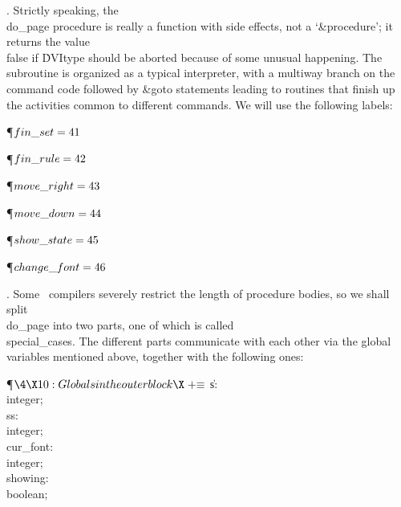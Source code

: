 . Strictly speaking, the \\{do\_page} procedure is really a function with
side effects, not a `\&{procedure}'\thinspace; it returns the value \\{false}
if \.{DVItype} should be aborted because of some unusual happening. The
subroutine is organized as a typical interpreter, with a multiway branch
on the command code followed by \&{goto}  statements leading to routines that
finish up the activities common to different commands. We will use the
following labels:

\Y\P\D {}$\\{fin\_set}=41$%
\par
\P\D {}$\\{fin\_rule}=42$\par
\P\D {}$\\{move\_right}=43$\par
\P\D {}$\\{move\_down}=44$\par
\P\D {}$\\{show\_state}=45$\par
\P\D {}$\\{change\_font}=46$%
\par
\fi

. Some \PASCAL\ compilers severely restrict the length of procedure bodies,
so we shall split \\{do\_page} into two parts, one of which is
called \\{special\_cases}. The different parts communicate with each other
via the global variables mentioned above, together with the following ones:

\Y\P$\4\X10:Globals in the outer block\X\mathrel{+}\S$\6
\4\|s: \\{integer};\6
\4\\{ss}: \\{integer};\6
\4\\{cur\_font}: \\{integer};\6
\4\\{showing}: \\{boolean};\par
\fi


